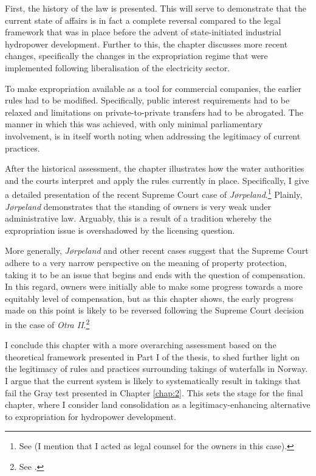 First, the history of the law is presented. This will serve to demonstrate that the current state of affairs is in fact a complete reversal compared to the legal framework that was in place before the advent of state-initiated industrial hydropower development. Further to this, the chapter discusses more recent changes, specifically the changes in the expropriation regime that were implemented following liberalisation of the electricity sector. 

To make expropriation available as a tool for commercial companies, the earlier rules had to be modified. Specifically, public interest requirements had to be relaxed and limitations on private-to-private transfers had to be abrogated. The manner in which this was achieved, with only minimal parliamentary involvement, is in itself worth noting when addressing the legitimacy of current practices.

After the historical assessment, the chapter illustrates how the water authorities and the courts interpret and apply the rules currently in place. Specifically, I give a detailed presentation of the recent Supreme Court case of {\it Jørpeland}.\footnote{See \cite{jorpeland11} (I mention that I acted as legal counsel for the owners in this case).} Plainly, {\it Jørpeland} demonstrates that the standing of owners is very weak under administrative law. Arguably, this is a result of a tradition whereby the expropriation issue is overshadowed by the licensing question.

More generally, {\it Jørpeland} and other recent cases suggest that the Supreme Court adhere to a very narrow perspective on the meaning of property protection, taking it to be an issue that begins and ends with the question of compensation. In this regard, owners were initially able to make some progress towards a more equitably level of compensation, but as this chapter shows, the early progress made on this point is likely to be reversed following the Supreme Court decision in the case of {\it Otra II}.\footnote{See \cite{otra13}.}

I conclude this chapter with a more overarching assessment based on the theoretical framework presented in Part I of the thesis, to shed further light on the legitimacy of rules and practices surrounding takings of waterfalls in Norway. I argue that the current system is likely to systematically result in takings that fail the Gray test presented in Chapter \ref{chap:2}. This sets the stage for the final chapter, where I consider land consolidation as a legitimacy-enhancing alternative to expropriation for hydropower development.

